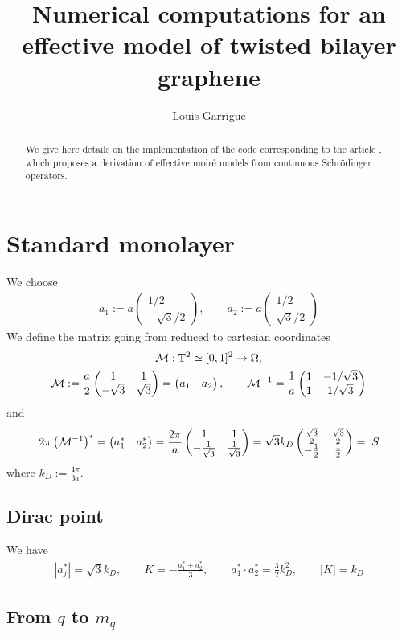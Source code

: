 \documentclass[11pt,a4paper,reqno,french,tikz]{amsart}
\title[Numerics effective TBG]{Numerical computations for an effective model of twisted bilayer graphene}
\author[Louis Garrigue]{Louis Garrigue}
\newcommand{\pa}[1]{\left( #1 \right)} %
\newcommand{\ab}[1]{\left|#1\right|} %
\newcommand{\f}[2]{\frac{#1}{#2}} %
\newcommand{\mat}[1]{\begin{pmatrix} #1 \end{pmatrix}} %
\begin{document}
\maketitle


\begin{abstract}
We give here details on the implementation of the code corresponding to the article \cite{CanGarGon22b}, which proposes a derivation of effective moiré models from continuous Schrödinger operators.
\end{abstract}


\section{Standard monolayer}%
\label{sec:standard_monolayer}

We choose
\begin{align*}
	a_1 := a\mat{1/2 \\ -\sqrt{3}/2}, \qquad a_2 := a\mat{1/2 \\ \sqrt{3}/2}
\end{align*}
We define the matrix going from reduced to cartesian coordinates
\begin{multline*}
	\cM : \mathbb{T}^2 \simeq [0,1]^2 \rightarrow \Omega, \\
	\cM :=  \f a2 \mat{1 & 1 \\ -\sqrt{3} & \sqrt{3}} = \mat{a_1 & a_2}, \qquad  \cM^{-1} = \f 1a \mat{1 & -1/\sqrt{3} \\ 1 & 1/\sqrt{3}}
\end{multline*}
and
\begin{align*}
	2\pi \pa{\cM^{-1}}^* = \mat{a_1^* & a_2^*} = \f{2\pi}a \mat{1 & 1 \\ -\f{1}{\sqrt 3} & \f{1}{\sqrt 3}}= \sqrt{3} k_D \mat{\f{\sqrt 3}{2} & \f{\sqrt 3}{2} \\ -\f 12 & \f 12} =: S
\end{align*}
where $k_D := \f{4\pi}{3a}$.

\subsection{Dirac point}%
\label{sub:dirac_point}

We have
\begin{align*}
	\ab{a_j^*} = \sqrt{3} k_D, \qquad  K = -\f{a_1^* +a_2^*}{3}, \qquad a_1^*\cdot a_2^* = \f{3}{2} k_D^2, \qquad \ab{K} = k_D
\end{align*}

\subsection{From $q$ to $m_q$}%
\label{sub:from_q_to_m_q_}
\end{document}
